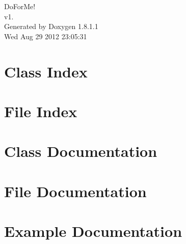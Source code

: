 \documentclass{book}
\begin{document}
\hypersetup{pageanchor=false,citecolor=blue}
\begin{titlepage}
\vspace*{7cm}
\begin{center}
{\Large Do\-For\-Me! \\[1ex]\large v1. }\\
\vspace*{1cm}
{\large Generated by Doxygen 1.8.1.1}\\
\vspace*{0.5cm}
{\small Wed Aug 29 2012 23:05:31}\\
\end{center}
\end{titlepage}
\clearemptydoublepage
{}
\tableofcontents
\clearemptydoublepage
{}
\hypersetup{pageanchor=true,citecolor=blue}
\chapter{Class Index}

\chapter{File Index}

\chapter{Class Documentation}
















\chapter{File Documentation}


































\chapter{Example Documentation}

\printindex
\end{document}
